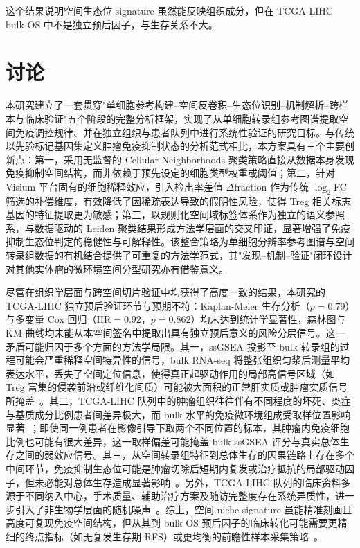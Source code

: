 \documentclass[12pt, a4paper]{ctexart}
\begin{document}
这个结果说明空间生态位 signature 虽然能反映组织成分，但在 TCGA-LIHC bulk OS 中不是独立预后因子，与生存关系不大。

\section{讨论}

本研究建立了一套贯穿"单细胞参考构建--空间反卷积--生态位识别--机制解析--跨样本与临床验证"五个阶段的完整分析框架，实现了从单细胞转录组参考图谱提取空间免疫调控规律、并在独立组织与患者队列中进行系统性验证的研究目标。与传统以先验标记基因集定义肿瘤免疫抑制状态的分析范式相比，本方案具有三个主要创新点：第一，采用无监督的 Cellular Neighborhoods 聚类策略直接从数据本身发现免疫抑制空间结构，而非依赖于预先设定的细胞类型权重或阈值；第二，针对 Visium 平台固有的细胞稀释效应，引入检出率差值 $\Delta$fraction 作为传统 $\log_2$FC 筛选的补偿维度，有效降低了因稀疏表达导致的假阴性风险，使得 Treg 相关标志基因的特征提取更为敏感；第三，以规则化空间域标签体系作为独立的语义参照系，与数据驱动的 Leiden 聚类结果形成方法学层面的交叉印证，显著增强了免疫抑制生态位判定的稳健性与可解释性。该整合策略为单细胞分辨率参考图谱与空间转录组数据的有机结合提供了可重复的方法学范式，其"发现--机制--验证"闭环设计对其他实体瘤的微环境空间分型研究亦有借鉴意义。

尽管在组织学层面与跨空间切片验证中均获得了高度一致的结果，本研究的 TCGA-LIHC 独立预后验证环节与预期不符：Kaplan-Meier 生存分析（$p = 0.79$）与多变量 Cox 回归（$\text{HR} = 0.92$，$p = 0.862$）均未达到统计学显著性，森林图与 KM 曲线均未能从本空间签名中提取出具有独立预后意义的风险分层信号。这一矛盾可能归因于多个方面的方法学局限。其一，ssGSEA 投影至 bulk 转录组的过程可能会严重稀释空间特异性的信号，bulk RNA-seq 将整张组织匀浆后测量平均表达水平，丢失了空间定位信息，使得真正起驱动作用的局部高信号区域（如 Treg 富集的侵袭前沿或纤维化间质）可能被大面积的正常肝实质或肿瘤实质信号所掩盖~\citep{svensson2018spatiallyvariable,gao2020loss}。其二，TCGA-LIHC 队列中的肿瘤组织往往伴有不同程度的坏死、炎症与基质成分比例患者间差异极大，而 bulk 水平的免疫微环境组成受取样位置影响显著~\citep{zhang2019landscape}；即使同一例患者在影像引导下取两个不同位置的标本，其肿瘤内免疫细胞比例也可能有很大差异，这一取样偏差可能掩盖 bulk ssGSEA 评分与真实总体生存之间的弱效应信号。其三，从空间转录组特征到总体生存的因果链路上存在多个中间环节，免疫抑制生态位可能是肿瘤切除后短期内复发或治疗抵抗的局部驱动因子，但未必能对总体生存造成显著影响~\citep{zhang2019landscape}。另外，TCGA-LIHC 队列的临床资料多源于不同纳入中心，手术质量、辅助治疗方案及随访完整度存在系统异质性，进一步引入了非生物学层面的随机噪声~\citep{liu2018tcga}。综上，空间 niche signature 虽能精准刻画且高度可复现免疫空间结构，但从其到 bulk OS 预后因子的临床转化可能需要更精细的终点指标（如无复发生存期 RFS）或更均衡的前瞻性样本采集策略~\citep{liu2018tcga}。
\end{document}
